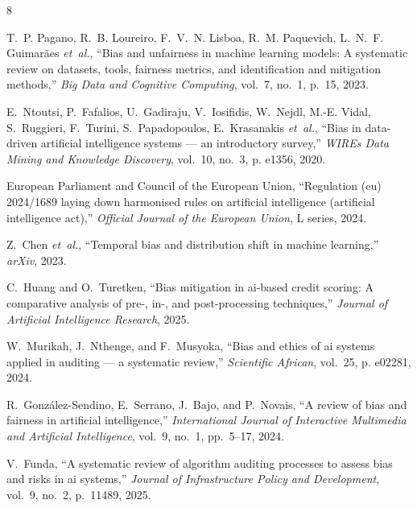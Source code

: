 \documentclass[conference]{IEEEtran}
\begin{document}
\begin{thebibliography}{8}

T.~P. Pagano, R.~B. Loureiro, F.~V.~N. Lisboa, R.~M. Paquevich, L.~N.~F. Guimar{\~a}es \emph{et~al.}, ``Bias and unfairness in machine learning models: A systematic review on datasets, tools, fairness metrics, and identification and mitigation methods,'' \emph{Big Data and Cognitive Computing}, vol.~7, no.~1, p.~15, 2023.

E.~Ntoutsi, P.~Fafalios, U.~Gadiraju, V.~Iosifidis, W.~Nejdl, M.-E. Vidal, S.~Ruggieri, F.~Turini, S.~Papadopoulos, E.~Krasanakis \emph{et~al.}, ``Bias in data-driven artificial intelligence systems --- an introductory survey,'' \emph{WIREs Data Mining and Knowledge Discovery}, vol.~10, no.~3, p. e1356, 2020.

European Parliament and Council of the European Union, ``Regulation (eu) 2024/1689 laying down harmonised rules on artificial intelligence (artificial intelligence act),'' \emph{Official Journal of the European Union}, L series, 2024.

Z.~Chen \emph{et~al.}, ``Temporal bias and distribution shift in machine learning,'' \emph{arXiv}, 2023.

C.~Huang and O.~Turetken, ``Bias mitigation in ai-based credit scoring: A comparative analysis of pre-, in-, and post-processing techniques,'' \emph{Journal of Artificial Intelligence Research}, 2025.

W.~Murikah, J.~Nthenge, and F.~Musyoka, ``Bias and ethics of ai systems applied in auditing --- a systematic review,'' \emph{Scientific African}, vol.~25, p. e02281, 2024.

R.~Gonz{\'a}lez-Sendino, E.~Serrano, J.~Bajo, and P.~Novais, ``A review of bias and fairness in artificial intelligence,'' \emph{International Journal of Interactive Multimedia and Artificial Intelligence}, vol.~9, no.~1, pp.~5--17, 2024.

V.~Funda, ``A systematic review of algorithm auditing processes to assess bias and risks in ai systems,'' \emph{Journal of Infrastructure Policy and Development}, vol.~9, no.~2, p.~11489, 2025.

\end{thebibliography}
\end{document}
